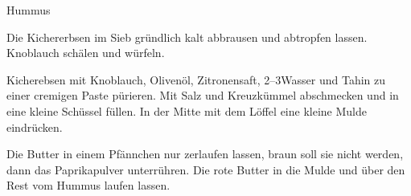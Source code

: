 \begin{recipe}[\vegan]{Hummus}

    \begin{ingredients}
    \end{ingredients}

    \begin{instructions}
        Die Kichererbsen im Sieb gründlich kalt abbrausen und abtropfen lassen.
        Knoblauch schälen und würfeln.

        Kicherebsen mit Knoblauch, Olivenöl, Zitronensaft, 2--3\el Wasser und Tahin zu einer cremigen Paste pürieren.
        Mit Salz und Kreuzkümmel abschmecken und in eine kleine Schüssel füllen.
        In der Mitte mit dem Löffel eine kleine Mulde eindrücken.

        Die Butter in einem Pfännchen nur zerlaufen lassen, braun soll sie nicht werden, dann das Paprikapulver unterrühren.
        Die rote Butter in die Mulde und über den Rest vom Hummus laufen lassen.
    \end{instructions}
\end{recipe}
